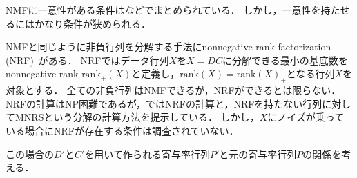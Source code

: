 NMFに一意性がある条件は\cite{Fu}などでまとめられている．
しかし，一意性を持たせるにはかなり条件が狭められる．

NMFと同じように非負行列を分解する手法にnonnegative rank factorization (NRF)~\cite{Dong2014}がある．
NRFではデータ行列$X$を$X = DC$に分解できる最小の基底数をnonnegative rank $\text{rank}_+(X)$と定義し，$\text{rank}(X) = \text{rank}(X)_+$となる行列$X$を対象とする．
全ての非負行列はNMFできるが，NRFができるとは限らない．
NRFの計算はNP困難であるが，\cite{Dong2014}ではNRFの計算と，NRFを持たない行列に対してMNRSという分解の計算方法を提示している．
しかし，$X$にノイズが乗っている場合にNRFが存在する条件は調査されていない．

この場合の$D'$と$C'$を用いて作られる寄与率行列$P'$と元の寄与率行列$P$の関係を考える．
